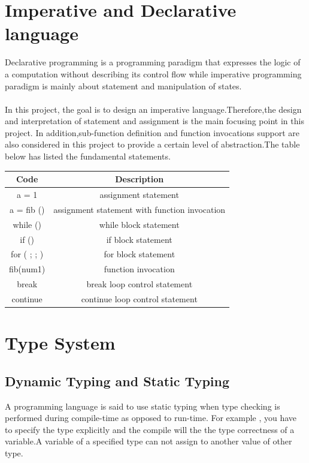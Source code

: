 \section{Imperative and Declarative language}
Declarative programming is a programming paradigm that expresses the logic of a computation without describing its control flow \cite{practical} while imperative programming paradigm is mainly about statement and manipulation of states.
\\ \\
In this project, the goal is to design an imperative language.Therefore,the design and interpretation of statement and assignment is the main focusing point in this project.
In addition,sub-function definition and function invocations support are also considered in this project to provide a certain level of abstraction.The table below has listed the fundamental statements.\\


\begin{tabular}{c|c}
\hline \textbf{Code} & \textbf{Description} \\
\hline  a = 1  &   assignment statement \\
\hline  a = fib () &  assignment statement with function invocation \\
\hline  while () {}&  while block statement\\
\hline if () {} &   if block statement \\
\hline for ( ; ; ) {} &  for block statement \\
\hline  fib(num1) &   function invocation  \\
\hline  break &   break loop control statement \\
\hline continue &   continue loop control statement \\
\hline 
\end{tabular} 

\section{Type System}
\subsection{Dynamic Typing and Static Typing}
A programming language is said to use static typing when type checking is performed during compile-time as opposed to run-time. 
For example , you have to specify the type explicitly and the compile will the the type correctness of a variable.A variable of a specified type can not assign to another value of other type.

